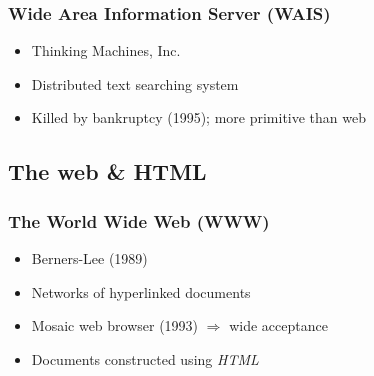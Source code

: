 \usebackgroundtemplate{}




\frame
{
	\frametitle{Wide Area Information Server (WAIS)}
	
	\begin{itemize}
	
		\item Thinking Machines, Inc.
		
		\item Distributed text searching system
		
		\item Killed by bankruptcy (1995); more primitive than web
	
	\end{itemize}

	
	\note{~}
}




\subsection*{The web \& HTML}




\frame
{
	\frametitle{The World Wide Web (WWW)}
	
	\begin{itemize}
	
		\item Berners-Lee (1989)
		
		\item Networks of hyperlinked documents
		
		
		\item Mosaic web browser (1993) \(\Rightarrow\) wide acceptance
		
		\item Documents constructed using \emph{HTML}
	
	\end{itemize}

}




